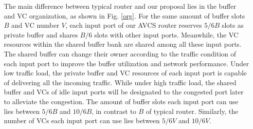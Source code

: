 \documentclass[10pt,conference]{IEEEtran}
\begin{document}
The main difference between typical router and our proposal lies in the buffer and VC organization, as shown in Fig. \ref{org}. For the same amount of buffer slots $B$ and VC number $V$, each input port of our AVCS router reserves $5/6B$ slots as private buffer and shares $B/6$ slots with other input ports. Meanwhile, the VC resources within the shared buffer bank are shared among all these input ports. The shared buffer can change their owner according to the traffic condition of each input port to improve the buffer utilization and network performance. Under low traffic load, the private buffer and VC resources of each input port is capable of delivering all the incoming traffic. While under high traffic load, the shared buffer and VCs of idle input ports will be designated to the congested port later to alleviate the congestion. The amount of buffer slots each input port can use lies between $5/6B$ and $10/6B$, in contrast to $B$ of typical router. Similarly, the number of VCs each input port can use lies between $5/6V$ and $10/6V$.

\end{document}
